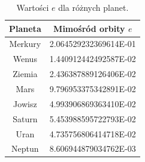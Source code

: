 \documentclass[11pt,wide]{mwart}
\begin{document}
\begin{table}[H] 

\begin{center}

\begin{tabular}{|c|c|} \hline
Planeta & Mimośród orbity $e$ \\ \hline
Merkury & 2.064529232369614E-01 \\
Wenus	& 1.440912442492587E-02 \\
Ziemia	& 2.436387889126406E-02 \\
Mars	& 9.796953375342891E-02 \\
Jowisz	& 4.993906869363410E-02 \\
Saturn	& 5.453988595722793E-02 \\
Uran	& 4.735756806414718E-02 \\
Neptun	& 8.606944879034762E-03 \\ \hline

\end{tabular}
\end{center}
\caption{Wartości $e$ dla różnych planet.}
\label{Tab}
\end{table}
\end{document}
